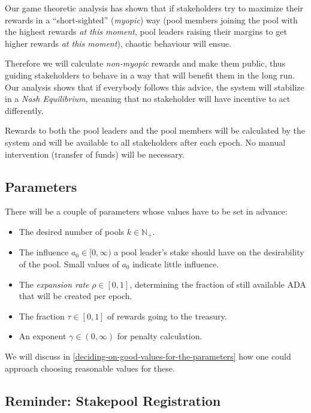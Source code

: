 \documentclass[11pt,a4paper]{article}
\begin{document}
Our game theoretic analysis has shown that if stakeholders try to
maximize their rewards in a ``short-sighted'' (\emph{myopic}) way (pool
members joining the pool with the highest rewards \emph{at this moment},
pool leaders raising their margins to get higher rewards \emph{at this
moment}), chaotic behaviour will ensue.

Therefore we will calculate \emph{non-myopic} rewards and make them
public, thus guiding stakeholders to behave in a way that will benefit
them in the long run. Our analysis shows that if everybody follows this
advice, the system will stabilize in a \emph{Nash Equilibrium}, meaning
that no stakeholder will have incentive to act differently.

Rewards to both the pool leaders and the pool members will be calculated
by the system and will be available to all stakeholders after each
epoch. No manual intervention (transfer of funds) will be necessary.

\subsection{Parameters}
\label{parameters}

There will be a couple of parameters whose values have to be set in
advance:

\begin{itemize}
\item
  The desired number of pools \(k\in\mathbb{N}_+\).
\item
  The influence \(a_0\in[0,\infty)\) a pool leader's stake should have
  on the desirability of the pool. Small values of \(a_0\) indicate
  little influence.
\item
  The \emph{expansion rate} \(\rho\in[0,1]\), determining the fraction
  of still available ADA that will be created per epoch.
\item
  The fraction \(\tau\in[0,1]\) of rewards going to the treasury.
\item
  An exponent \(\gamma\in(0,\infty)\) for penalty calculation.
\end{itemize}

We will discuss
in \cref{deciding-on-good-values-for-the-parameters} how one
could approach choosing reasonable values for these.

\subsection{Reminder: Stakepool Registration}
\label{reminder-stakepool-registration}
\end{document}
